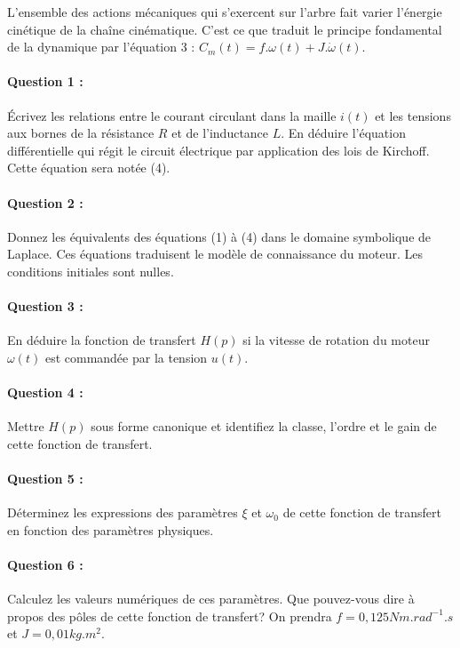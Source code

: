 L'ensemble des actions mécaniques qui s'exercent sur l'arbre fait varier l'énergie cinétique de la chaîne cinématique. C'est ce que traduit le principe fondamental de la dynamique par l'équation 3 : $C_m(t)=f.\omega(t)+J.\dot{\omega}(t)$.

\paragraph{Question 1 :} Écrivez les relations entre le courant circulant dans la maille $i(t)$ et les tensions aux bornes de la résistance $R$ et de l'inductance $L$. En déduire l'équation différentielle qui régit le circuit électrique par application des lois de Kirchoff. Cette équation sera notée (4).

\paragraph{Question 2 :} Donnez les équivalents des équations (1) à (4) dans le domaine symbolique de Laplace. Ces équations traduisent le modèle de connaissance du moteur. Les conditions initiales sont nulles.

\paragraph{Question 3 :} En déduire la fonction de transfert $H(p)$ si la vitesse de rotation du moteur $\omega(t)$ est commandée par la tension $u(t)$.

\paragraph{Question 4 :} Mettre $H(p)$ sous forme canonique et identifiez la classe, l'ordre et le gain de cette fonction de transfert.

\paragraph{Question 5 :} Déterminez les expressions des paramètres $\xi$ et $\omega_0$ de cette fonction de transfert en fonction des paramètres physiques.

\paragraph{Question 6 :} Calculez les valeurs numériques de ces paramètres. Que pouvez-vous dire à propos des pôles de cette fonction de transfert? On prendra $f=0,125Nm.rad^{-1}.s$ et $J=0,01kg.m^2$.

